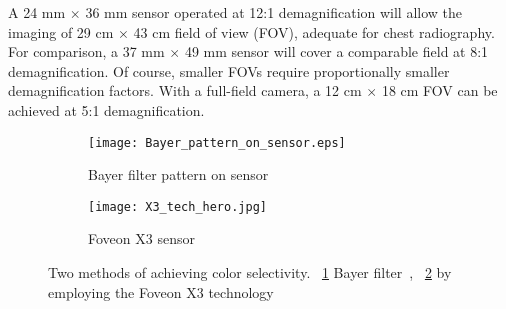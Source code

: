 A 24 mm $\times$ 36 mm sensor operated at 12:1 demagnification will allow the imaging of 29 cm $\times$ 43 cm field of view (FOV), adequate for chest radiography. For comparison, a 37 mm $\times$ 49 mm sensor will cover a comparable field at 8:1 demagnification. Of course, smaller FOVs require proportionally smaller demagnification factors. With a full-field camera, a 12 cm $\times$ 18 cm FOV can be achieved at 5:1 demagnification.

\begin{figure}[h]
	\begin{subfigure}[b]{0.4\linewidth}
		\centering
		\texttt{[image: Bayer\_pattern\_on\_sensor.eps]}
		\caption{Bayer filter pattern on sensor}
		\label{fig:bayer_pattern_on_sensor}
	\end{subfigure}
	\hspace{0.5cm}
	\begin{subfigure}[b]{0.4\linewidth}
		\centering
		\texttt{[image: X3\_tech\_hero.jpg]}
		\caption{Foveon X3 sensor}
		\label{fig:foveon_sensor}
	\end{subfigure}
\caption{Two methods of achieving color selectivity. ~\ref{fig:bayer_pattern_on_sensor} Bayer filter~\citep{wikibayer}, ~\ref{fig:foveon_sensor} by employing the Foveon X3 technology~\citep{foveon}}
\label{fig:color_selectivity}	
\end{figure}

